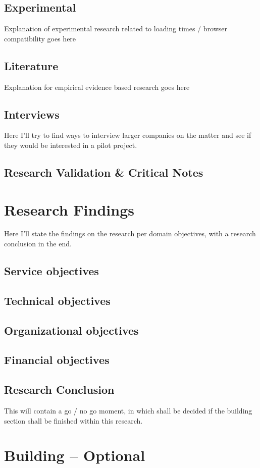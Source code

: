 \documentclass[signatures]{Thesis}
\begin{document}
    \section{Experimental}
    Explanation of experimental research related to loading times / browser compatibility goes here
    \section{Literature}
    Explanation for empirical evidence based research goes here
    \section{Interviews}
    Here I'll try to find ways to interview larger companies on the matter and see if they would be interested in a pilot project.
    \section{Research Validation \& Critical Notes}
    
    
\chapter{Research Findings}
Here I'll state the findings on the research per domain objectives, with a research conclusion in the end.
	\section{Service objectives}
    \section{Technical objectives}
    \section{Organizational objectives}
    \section{Financial objectives}
	\section{Research Conclusion}
	This will contain a go / no go moment, in which shall be decided if the building section shall be finished within this research.
	
\chapter{Building -- Optional}
\end{document}
